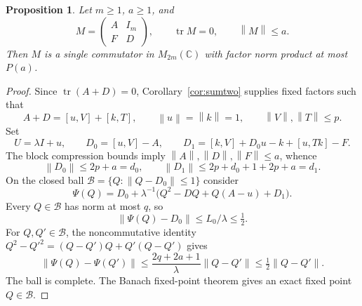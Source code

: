 \documentclass[11pt]{article}
\newtheorem{proposition}[theorem]{Proposition}
\theoremstyle{remark}
\newcommand{\C}{\mathbb C}
\newcommand{\tr}{\operatorname{tr}}
\newcommand{\norm}[1]{\left\lVert#1\right\rVert}
\newcommand{\comm}[2]{[#1,#2]}
\numberwithin{equation}{section}
\begin{document}
\begin{proposition}\label{prop:core}
Let $m\ge1$, $a\ge1$, and
\[
 M=\begin{pmatrix}A&I_m\\F&D\end{pmatrix},\qquad
 \tr M=0,\qquad \norm M\le a.
\]
Then $M$ is a single commutator in $M_{2m}(\C)$ with factor norm product at most
$P(a)$.
\end{proposition}
\begin{proof}
Since $\tr(A+D)=0$, Corollary~\ref{cor:sumtwo} supplies fixed factors such that
\[
 A+D=\comm uV+\comm kT,\qquad
 \norm u=\norm k=1,\qquad \norm V,\norm T\le p.
\]
Set
\begin{equation}\label{eq:defects}
 U=\lambda I+u,\qquad D_0=\comm uV-A,\qquad
 D_1=\comm kV+D_0u-k+\comm u{Tk}-F.
\end{equation}
The block compression bounds imply $\norm A,\norm D,\norm F\le a$, whence
\[
 \norm{D_0}\le2p+a=d_0,\qquad
 \norm{D_1}\le2p+d_0+1+2p+a=d_1.
\]
On the closed ball $\mathcal B=\{Q:\norm{Q-D_0}\le1\}$ consider
\begin{equation}\label{eq:fixedpoint}
 \Psi(Q)=D_0+\lambda^{-1}
       \bigl(Q^2-DQ+Q(A-u)+D_1\bigr).
\end{equation}
Every $Q\in\mathcal B$ has norm at most $q$, so
\[
 \norm{\Psi(Q)-D_0}\le L_0/\lambda\le\tfrac12.
\]
For $Q,Q'\in\mathcal B$, the noncommutative identity
$Q^2-Q'^2=(Q-Q')Q+Q'(Q-Q')$ gives
\[
 \norm{\Psi(Q)-\Psi(Q')}\le
 \frac{2q+2a+1}{\lambda}\norm{Q-Q'}\le\tfrac12\norm{Q-Q'}.
\]
The ball is complete. The Banach fixed-point theorem gives an exact fixed point
$Q\in\mathcal B$.


\end{proof}
\end{document}
